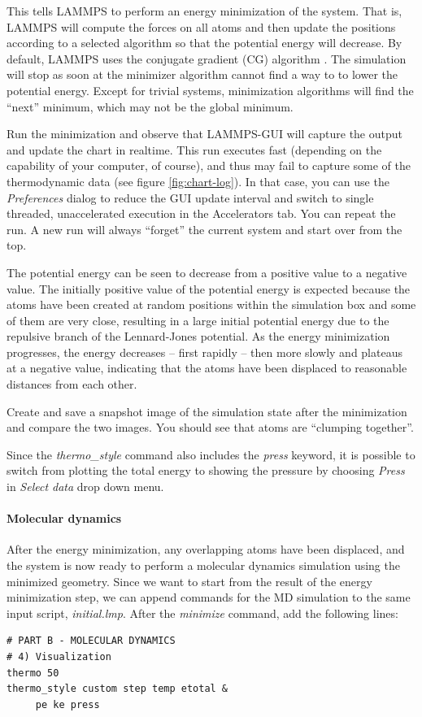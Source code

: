 \documentclass[9pt,tutorial]{livecoms}
\begin{document}
This tells LAMMPS to perform an energy minimization of the system.  That
is, LAMMPS will compute the forces on all atoms and then update the
positions according to a selected algorithm so that the potential energy
will decrease.  By default, LAMMPS uses the conjugate gradient (CG)
algorithm \cite{hestenes1952methods}.  The simulation will stop as soon
at the minimizer algorithm cannot find a way to to lower the potential
energy.  Except for trivial systems, minimization algorithms will find
the ``next'' minimum, which may not be the global minimum.

Run the minimization and observe that LAMMPS-GUI will capture the output
and update the chart in realtime.  This run executes fast (depending on
the capability of your computer, of course), and thus may fail to
capture some of the thermodynamic data (see figure \ref{fig:chart-log}).
In that case, you can use the \textit{Preferences} dialog to reduce the
GUI update interval and switch to single threaded, unaccelerated
execution in the Accelerators tab.  You can repeat the run.  A new run
will always ``forget'' the current system and start over from the top.

The potential energy can be seen to decrease from a positive value to a
negative value.  The initially positive value of the potential energy is
expected because the atoms have been created at random positions within
the simulation box and some of them are very close, resulting in a large
initial potential energy due to the repulsive branch of the
Lennard-Jones potential.  As the energy minimization progresses, the
energy decreases -- first rapidly -- then more slowly and plateaus at
a negative value, indicating that the atoms have been displaced to
reasonable distances from each other.

Create and save a snapshot image of the simulation state after the
minimization and compare the two images.  You should see that atoms
are ``clumping together''.

Since the \textit{thermo\_style} command also includes the \textit{press}
keyword, it is possible to switch from plotting the total energy to
showing the pressure by choosing \textit{Press} in \textit{Select data}
drop down menu.

\paragraph{Molecular dynamics}

After the energy minimization, any overlapping atoms have been displaced,
and the system is now ready to perform a molecular dynamics simulation
using the minimized geometry.  Since we want to start from the result of
the energy minimization step, we can append commands for the MD simulation
to the same input script, \textit{initial.lmp}. After the
\textit{minimize} command, add the following lines:
{\normalsize
\begin{verbatim}
# PART B - MOLECULAR DYNAMICS
# 4) Visualization
thermo 50
thermo_style custom step temp etotal &
     pe ke press
\end{verbatim}
}
\end{document}
